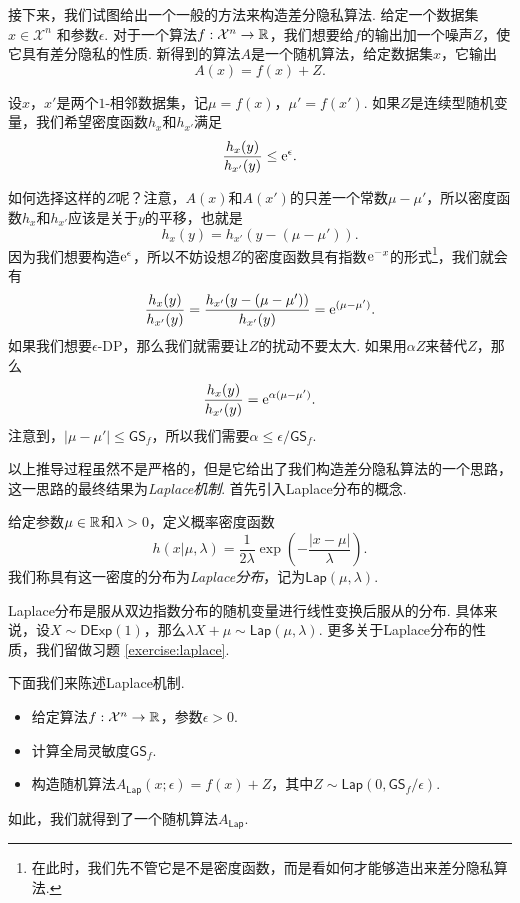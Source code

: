 接下来，我们试图给出一个一般的方法来构造差分隐私算法. 给定一个数据集$x \in \mathcal X^n$ 和参数$\epsilon$. 对于一个算法$f:\mathcal X^n \to \mathbb{R}$，我们想要给$f$的输出加一个噪声$Z$，使它具有差分隐私的性质. 新得到的算法$A$是一个随机算法，给定数据集$x$，它输出
\[
    A(x)=f(x)+Z.
\]

设$x$，$x'$是两个$1$-相邻数据集，记$\mu = f(x)$，$\mu' = f(x')$. 如果$Z$是连续型随机变量，我们希望密度函数$h_{x}$和$h_{x'}$满足
\[
    \frac{h_{x}(y)}{h_{x'}(y)} \leq \mathrm{e}^{\epsilon}.
\]

如何选择这样的$Z$呢？注意，$A(x)$和$A(x')$的只差一个常数$\mu - \mu'$，所以密度函数$h_{x}$和$h_{x'}$应该是关于$y$的平移，也就是
\[
    h_{x}(y) = h_{x'}(y - (\mu - \mu')).
\]
因为我们想要构造$\mathrm{e}^\epsilon$，所以不妨设想$Z$的密度函数具有指数$\mathrm{e}^{-x}$的形式\footnote{在此时，我们先不管它是不是密度函数，而是看如何才能够造出来差分隐私算法.}，我们就会有
\[
    \frac{h_{x}(y)}{h_{x'}(y)} = \frac{h_{x'}(y - (\mu - \mu'))}{h_{x'}(y)} = \mathrm{e}^{(\mu - \mu')}.
\]
如果我们想要$\epsilon$-DP，那么我们就需要让$Z$的扰动不要太大. 如果用$\alpha Z$来替代$Z$，那么
\[
    \frac{h_{x}(y)}{h_{x'}(y)} = \mathrm{e}^{\alpha(\mu - \mu')}.
\]
注意到，$|\mu - \mu'| \leq \mathsf{GS}_f$，所以我们需要$\alpha \leq \epsilon/\mathsf{GS}_f$.

以上推导过程虽然不是严格的，但是它给出了我们构造差分隐私算法的一个思路，这一思路的最终结果为\textit{Laplace机制}. 首先引入Laplace分布的概念.

\begin{definition}[Laplace分布]
    给定参数$\mu\in\mathbb{R}$和$\lambda>0$，定义概率密度函数
        \[h(x  | \mu, \lambda) = \frac1{2\lambda}\exp\left(- \frac{|x - \mu|}{\lambda}\right).\]
我们称具有这一密度的分布为\textit{Laplace分布}，记为$\mathsf{Lap}(\mu,\lambda)$.
\end{definition}

Laplace分布是服从双边指数分布的随机变量进行线性变换后服从的分布. 具体来说，设$X\sim\mathsf{DExp}(1)$，那么$\lambda X+\mu\sim\mathsf{Lap}(\mu,\lambda)$. 更多关于Laplace分布的性质，我们留做习题 \ref{exercise:laplace}.

下面我们来陈述Laplace机制.

\begin{itemize}
    \item 给定算法$f:\mathcal X^n \to \mathbb{R}$，参数$\epsilon>0$.
    \item 计算全局灵敏度$\mathsf{GS}_f$.
    \item 构造随机算法$A_{\mathsf{Lap}}(x;\epsilon) = f(x) + Z$，其中$Z\sim \mathsf{Lap}(0, \mathsf{GS}_f/\epsilon)$.
\end{itemize}
如此，我们就得到了一个随机算法$A_{\mathsf{Lap}}$. 

